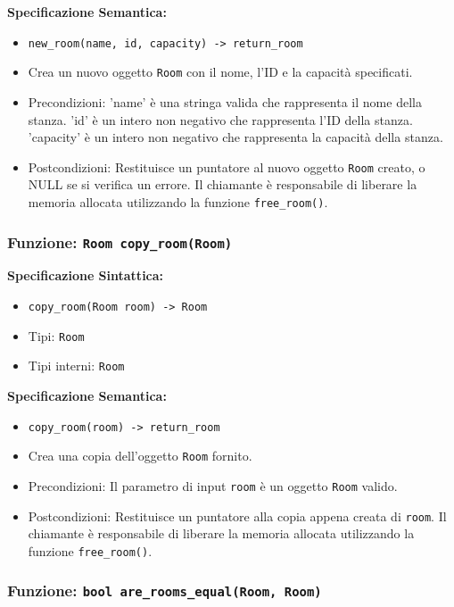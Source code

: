 \documentclass[11pt]{scrartcl} %
\begin{document}
\textbf{Specificazione Semantica:}
\begin{itemize}
	\item \texttt{new\_room(name, id, capacity) -> return\_room}
	\item Crea un nuovo oggetto \texttt{Room} con il nome, l'ID e la capacità specificati.
	\item Precondizioni: 'name' è una stringa valida che rappresenta il nome della stanza. 'id' è un intero non negativo che rappresenta l'ID della stanza. 'capacity' è un intero non negativo che rappresenta la capacità della stanza.
	\item Postcondizioni: Restituisce un puntatore al nuovo oggetto \texttt{Room} creato, o NULL se si verifica un errore. Il chiamante è responsabile di liberare la memoria allocata utilizzando la funzione \texttt{free\_room()}.
\end{itemize}

\subsubsection{Funzione: \texttt{Room copy\_room(Room)}}

\textbf{Specificazione Sintattica:}
\begin{itemize}
	\item \texttt{copy\_room(Room room) -> Room}
	\item Tipi: \texttt{Room}
	\item Tipi interni: \texttt{Room}
\end{itemize}

\textbf{Specificazione Semantica:}
\begin{itemize}
	\item \texttt{copy\_room(room) -> return\_room}
	\item Crea una copia dell'oggetto \texttt{Room} fornito.
	\item Precondizioni: Il parametro di input \texttt{room} è un oggetto \texttt{Room} valido.
	\item Postcondizioni: Restituisce un puntatore alla copia appena creata di \texttt{room}. Il chiamante è responsabile di liberare la memoria allocata utilizzando la funzione \texttt{free\_room()}.
\end{itemize}

\subsubsection{Funzione: \texttt{bool are\_rooms\_equal(Room, Room)}}
\end{document}
